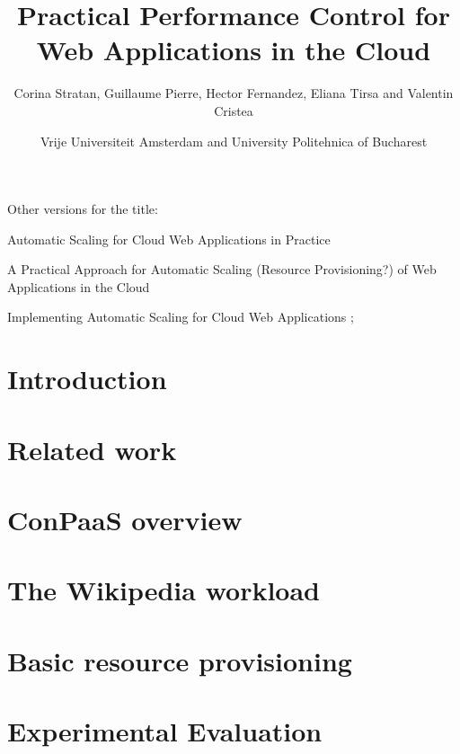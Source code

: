 \documentclass[10pt,twocolumn]{article}
\begin{document}
\begin{multicols}{2}
\title{Practical Performance Control for Web Applications in the Cloud}
\author{Corina Stratan, Guillaume Pierre, Hector Fernandez, Eliana Tirsa and Valentin Cristea} 
\date{Vrije Universiteit Amsterdam and University Politehnica of Bucharest}
\maketitle
\end{multicols}


Other versions for the title:

Automatic Scaling for Cloud Web Applications in Practice

A Practical Approach for Automatic Scaling (Resource Provisioning?) of
Web Applications in the Cloud

Implementing Automatic Scaling for Cloud Web Applications
;

\section*{Introduction}



\section*{Related work}



\section*{ConPaaS overview}



\section*{The Wikipedia workload}



\section*{Basic resource provisioning}



\section*{Experimental Evaluation}
\end{document}
